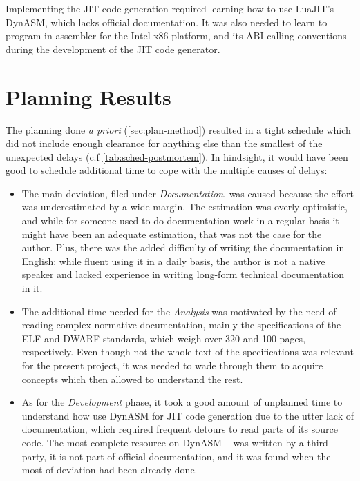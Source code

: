 Implementing the JIT code generation required learning how to use LuaJIT's
DynASM, which lacks official documentation. It was also needed to learn to
program in assembler for the Intel x86 platform, and its \gls{ABI} calling
conventions during the development of the JIT code generator.


\section{Planning Results}

The planning done \emph{a priori} (\autoref{sec:plan-method}) resulted in a
tight schedule which did not include enough clearance for anything else than
the smallest of the unexpected delays (c.f \autoref{tab:sched-postmortem}).
In hindsight, it would have been good to schedule additional time to cope
with the multiple causes of delays:

\begin{itemize}

	\item The main deviation, filed under \emph{Documentation}, was caused
	because the effort was underestimated by a wide margin. The estimation was
	overly optimistic, and while for someone used to do documentation work in
	a regular basis it might have been an adequate estimation, that was not
	the case for the author. Plus, there was the added difficulty of writing
	the documentation in English: while fluent using it in a daily basis, the
	author is not a native speaker and lacked experience in writing long-form
	technical documentation in it.

	\item The additional time needed for the \emph{Analysis} was motivated by
	the need of reading complex normative documentation, mainly the
	specifications of the \gls{ELF} and \gls{DWARF} standards, which weigh
	over 320 and 100 pages, respectively. Even though not the whole text of
	the specifications was relevant for the present project, it was needed to
	wade through them to acquire concepts which then allowed to understand the
	rest.

	\item As for the \emph{Development} phase, it took a good amount of
	unplanned time to understand how use DynASM for JIT code generation due to
	the utter lack of documentation, which required frequent detours to read
	parts of its source code. The most complete resource on DynASM
	~\cite{unofficial-dasm-doc} was written by a third party, it is not part
	of official documentation, and it was found when the most of deviation had
	been already done.

\end{itemize}

